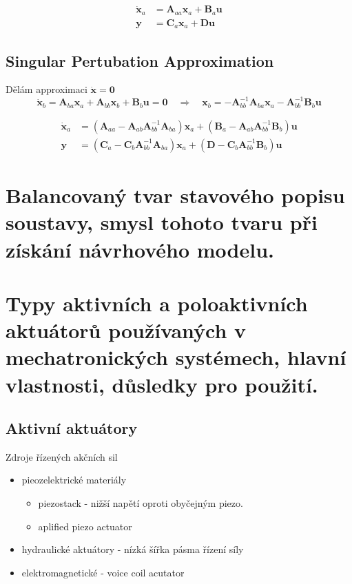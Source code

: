 \documentclass{article}
\begin{document}
	\begin{align}
		\bm{\dot{x}}_a &= \bm{A}_{aa} \bm{x}_a + \bm{B}_a \bm{u} \\
		\bm{y} &= \bm{C}_a \bm{x}_a + \bm{D}\bm{u}
	\end{align}

	\subsection{Singular Pertubation Approximation}

	Dělám approximaci $\bm{\dot{x}} = \bm{0}$
	\begin{equation}
		\bm{\dot{x}}_b = \bm{A}_{ba}\bm{x}_a + \bm{A}_{bb}\bm{x}_b + \bm{B}_b\bm{u} = \bm{0}
		\quad \Rightarrow \quad
		\bm{x}_b = -\bm{A}_{bb}^{-1}\bm{A}_{ba} \bm{x}_a - \bm{A}_{bb}^{-1} \bm{B}_b \bm{u}
	\end{equation}

	\begin{align}
		\bm{\dot{x}}_a
		&=
		(\bm{A}_{aa} - \bm{A}_{ab} \bm{A}_{bb}^{-1} \bm{A}_{ba}) \bm{x}_a
		+ 
		(\bm{B}_a - \bm{A}_{ab} \bm{A}_{bb}^{-1} \bm{B}_b) \bm{u} \\
		\bm{y}
		&=
		(\bm{C}_a - \bm{C}_b \bm{A}_{bb}^{-1} \bm{A}_{ba}) \bm{x}_a
		+
		(\bm{D} - \bm{C}_b \bm{A}_{bb}^{-1} \bm{B}_b) \bm{u}
	\end{align}

	\section{Balancovaný tvar stavového popisu soustavy, smysl tohoto tvaru při získání návrhového modelu.}

	\section{Typy aktivních a poloaktivních aktuátorů používaných v mechatronických systémech, hlavní vlastnosti, důsledky pro použití.}

	\subsection{Aktivní aktuátory}
	Zdroje řízených akčních sil
	\begin{itemize}
		\item pieozelektrické materiály
			\begin{itemize}
			\item piezostack - nižší napětí oproti obyčejným piezo.
			\item aplified piezo actuator
			\end{itemize}
		\item hydraulické aktuátory - nízká šířka pásma řízení síly
		\item elektromagnetické - voice coil acutator
	\end{itemize}
\end{document}
